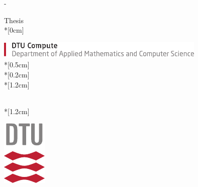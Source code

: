 \thispagestyle{empty}             %
\calccentering{\unitlength}
\begin{adjustwidth*}{\unitlength}{-\unitlength}
    \begin{adjustwidth}{-0.5cm}{-0.5cm}
        \sffamily
        \begin{flushright}
            \thesistypeabbr{} Thesis\\*[0cm]
            \thesistype{}\\
        \end{flushright}
        \vspace*{\fill}
        \noindent
        \includegraphics[width=0.75\textwidth]{graphics/DTU-Compute-B-UK}\\*[0.5cm]
        \Huge \thesistitle{}\\*[0.2cm]
        \LARGE \thesissubtitle{}\\*[1.2cm]
        \parbox[b]{0.5\linewidth}{%
            \large 
            \thesisauthor{}\\*[1.2cm]
            \normalsize
            \thesislocation{} \thesisyear{}\\
            \thesisnumber{}
        }
        \hfill\includegraphics[scale=0.7]{graphics/DTU-logo-CMYK}
    \end{adjustwidth}
\end{adjustwidth*}
\normalfont
\normalsize
